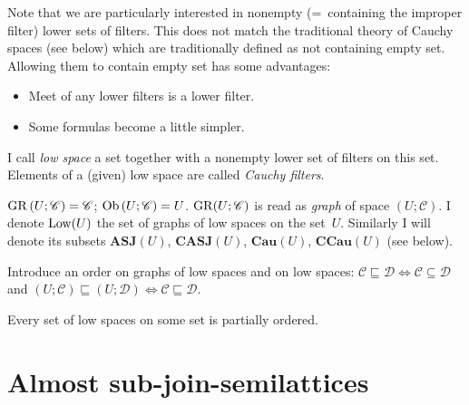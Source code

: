 \begin{rem}
Note that we are particularly interested in nonempty (=~containing the improper filter) lower sets of filters.
This does not match the traditional theory of Cauchy spaces (see below) which are traditionally defined as not containing empty set.
Allowing them to contain empty set has some advantages:
\begin{itemize}
\item Meet of any lower filters is a lower filter.
\item Some formulas become a little simpler.
\end{itemize}
\end{rem}


\begin{defn}
  I call \emph{low space} a set together with a nonempty lower set of
  filters on this set.
  Elements of a (given) low space are called \emph{Cauchy filters}.
\end{defn}

\begin{defn}
  $\operatorname{GR} \left( U ; \mathscr{C} \right) = \mathscr{C}$; $\operatorname{Ob} \left(
  U ; \mathscr{C} \right) = U$.
  $\operatorname{GR} (U; \mathscr{C})$ is read as \emph{graph} of space $(U; \mathscr{C})$.
  I denote $\operatorname{Low}(U)$ the set of graphs of low spaces on the set~$U$.
  Similarly I will denote its subsets $\mathbf{ASJ}(U)$, $\mathbf{CASJ}(U)$, $\mathbf{Cau}(U)$, $\mathbf{CCau}(U)$ (see below).
\end{defn}


\begin{defn}
  Introduce an order on graphs of low spaces and on low spaces:
  $\mathscr{C}\sqsubseteq\mathscr{D}\Leftrightarrow\mathscr{C}\subseteq\mathscr{D}$ and
  $\left( U ; \mathscr{C} \right) \sqsubseteq \left( U ; \mathscr{D} \right) \Leftrightarrow \mathscr{C} \sqsubseteq \mathscr{D}$.
\end{defn}

\begin{obvious}
Every set of low spaces on some set is partially ordered.
\end{obvious}

\section{Almost sub-join-semilattices}


